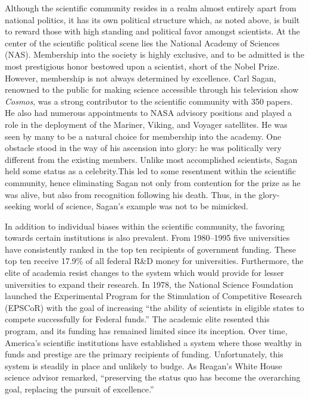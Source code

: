 \documentclass{article}[12pt]
\begin{document}
Although the scientific community resides in a realm almost entirely apart from
national politics, it has its own political structure which, as noted above, is
built to reward those with high standing and political favor amongst
scientists. At the center of the scientific political scene lies the National
Academy of Sciences (NAS). Membership into the society is highly exclusive, and
to be admitted is the most prestigious honor bestowed upon a scientist, short
of the Nobel Prize. However, membership is not always determined
by excellence. Carl Sagan, renowned to the public for making science accessible
through his television show \emph{Cosmos}, was a strong contributor to the
scientific community with 350 papers.  He also had numerous appointments to
NASA advisory positions and played a role in the deployment of the Mariner,
Viking, and Voyager satellites. He was seen by many to be a natural choice for
membership into the academy. One obstacle stood in the way
of his ascension into glory: he was politically very different from the
existing members. Unlike most accomplished scientists, Sagan held some status
as a celebrity.This led to some resentment within the scientific community,
hence eliminating Sagan not only from contention for the prize as he was alive,
but also from recognition following his death. Thus, in the
glory-seeking world of science, Sagan's example was not to be mimicked.

In addition to individual biases within the scientific community, the favoring
towards certain institutions is also prevalent.  From 1980--1995 five
universities have consistently ranked in the top ten recipients of government
funding.  These top ten receive 17.9\% of all federal R\&D money
for universities. Furthermore, the elite of academia resist changes to the
system which would provide for lesser universities to expand their research. In
1978, the National Science Foundation launched the Experimental Program for the
Stimulation of Competitive Research (EPSCoR) with the goal of increasing ``the
ability of scientists in eligible states to compete successfully for Federal
funds.'' The academic elite resented this program, and its funding has remained
limited since its inception.  Over time, America's scientific
institutions have established a system where those wealthy in funds and
prestige are the primary recipients of funding.  Unfortunately, this system is
steadily in place and unlikely to budge. As Reagan's White House science
advisor remarked, ``preserving the status quo has become the overarching goal,
replacing the pursuit of excellence.''
\end{document}
